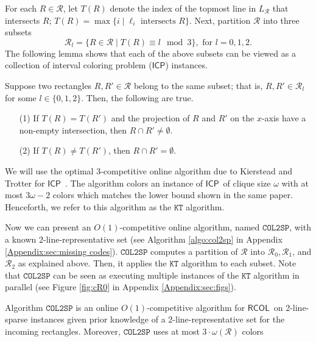 \documentclass[a4paper,UKenglish]{lipics-v2016}
\newcommand{\icp}{\mbox{$\mathsf{ICP}$}}
\newcommand{\rcol}{\mbox{$\mathsf{RCOL}$}}
\theoremstyle{plain}
\newcommand{\cR}{\mathcal{R}}
\newcommand{\algtwoSp}{\mathtt{COL2SP}}
\begin{document}
For each $R\in \cR$, let $T(R)$ denote the index of the topmost line in $L_\cR$ that intersects $R$; $T(R)=\max\{ i \mid \ell_i \text{ intersects } R \}$. Next, partition $\cR$ into three subsets
\begin{equation} \label{eq:RL}
\cR_l = \{ R\in \cR \mid T(R)\equiv l\mod 3 \}, \text{ for } l=0,1,2.
\end{equation}
%
The following lemma shows that each of the above subsets can be viewed as a collection of interval coloring problem (\icp) instances.
\begin{lemma}\label{lem:sparse}
Suppose two rectangles $R,R'\in \cR$ belong to the same subset; that is, $R,R'\in \cR_l$ for some $l\in\{0,1,2\}$. Then, the following are true.
\begin{enumerate}
\item[(1)] If $T(R)=T(R')$ and the projection of $R$ and $R'$ on the $x$-axis have a non-empty intersection, then $R \cap R'\neq\emptyset$.

\item[(2)] If $T(R)\neq T(R')$, then $R \cap R'=\emptyset$.
\end{enumerate}
\label{lemma: rcol into interval coloring}
\end{lemma}

We will use the optimal 3-competitive online algorithm due to Kierstead and Trotter for \icp\ \cite{KT}. The algorithm colors an instance of \icp\ of clique size $\omega$ with at most $3\omega-2$ colors which matches the lower bound shown in the same paper. Henceforth, we refer to this algorithm as the $\mathtt{KT}$ algorithm.

Now we can present an $O(1)$-competitive online algorithm, named $\algtwoSp$, with a known $2$-line-representative set (see Algorithm \ref{algo:col2sp} in Appendix \ref{Appendix:sec:missing codes}). $\algtwoSp$ computes a partition of $\cR$ into $\cR_0, \cR_1$, and $\cR_2$ as explained above. Then, it applies the $\mathtt{KT}$ algorithm to each subset. Note that $\algtwoSp$ can be seen as executing multiple instances of the $\mathtt{KT}$ algorithm in parallel (see Figure \ref{fig:cR0} in Appendix \ref{Appendix:sec:figs}).

\begin{lemma}
Algorithm $\algtwoSp$ is an online $O(1)$-competitive algorithm for \rcol\ on 2-line-sparse instances given prior knowledge of a 2-line-representative set for the incoming rectangles. Moreover, $\algtwoSp$ uses at most $3\cdot\omega(\cR)$ colors%
\label{lemma: Algorithm algtwoSp is O(1)-comp}
\end{lemma}
\end{document}
